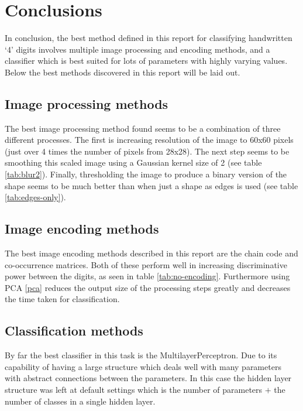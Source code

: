\documentclass[12pt]{article}
\begin{document}
\section{Conclusions}
  In conclusion, the best method defined in this report for classifying handwritten ‘4’ digits involves multiple image processing and encoding methods, and a classifier which is best suited for lots of parameters with highly varying values. Below the best methods discovered in this report will be laid out.

  \subsection{Image processing methods} \label{improc}
    The best image processing method found seems to be a combination of three different processes. The first is increasing resolution of the image to 60x60 pixels (just over 4 times the number of pixels from 28x28). The next step seems to be smoothing this scaled image using a Gaussian kernel size of 2 (see table \ref{tab:blur2}). Finally, thresholding the image to produce a binary version of the shape seems to be much better than when just a shape as edges is used (see table \ref{tab:edges-only}).

  \subsection{Image encoding methods} \label{imenc}
    The best image encoding methods described in this report are the chain code and co-occurrence matrices. Both of these perform well in increasing discriminative power between the digits, as seen in table \ref{tab:no-encoding}. Furthermore using PCA \ref{pca} reduces the output size of the processing steps greatly and decreases the time taken for classification.

  \subsection{Classification methods} \label{imcls}
    By far the best classifier in this task is the MultilayerPerceptron. Due to its capability of having a large structure which deals well with many parameters with abstract connections between the parameters. In this case the hidden layer structure was left at default settings which is the number of parameters $+$ the number of classes in a single hidden layer.
\end{document}
